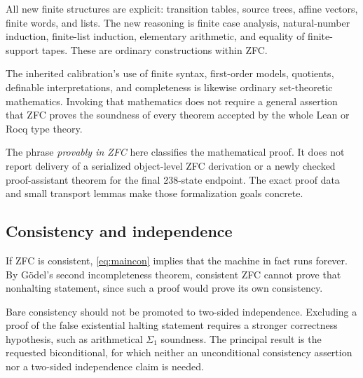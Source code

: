 All new finite structures are explicit: transition tables,
source trees, affine vectors, finite words, and lists. The
new reasoning is finite case analysis, natural-number induction,
finite-list induction, elementary arithmetic, and equality
of finite-support tapes. These are ordinary constructions
within ZFC.

The inherited calibration's use of finite syntax, first-order
models, quotients, definable interpretations, and completeness
is likewise ordinary set-theoretic mathematics. Invoking that
mathematics does not require a general assertion that ZFC
proves the soundness of every theorem accepted by the whole
Lean or Rocq type theory.

The phrase \emph{provably in ZFC} here classifies the mathematical
proof. It does not report delivery of a serialized object-level
ZFC derivation or a newly checked proof-assistant theorem for
the final 238-state endpoint. The exact proof data and small
transport lemmas make those formalization goals concrete.

\subsection{Consistency and independence}

If ZFC is consistent, \eqref{eq:maincon} implies that the
machine in fact runs forever. By G\"odel's second
incompleteness theorem, consistent ZFC cannot prove that
nonhalting statement, since such a proof would prove its own
consistency.

Bare consistency should not be promoted to two-sided
independence. Excluding a proof of the false existential
halting statement requires a stronger correctness hypothesis,
such as arithmetical $\Sigma_1$ soundness. The principal
result is the requested biconditional, for which neither
an unconditional consistency assertion nor a two-sided
independence claim is needed.
